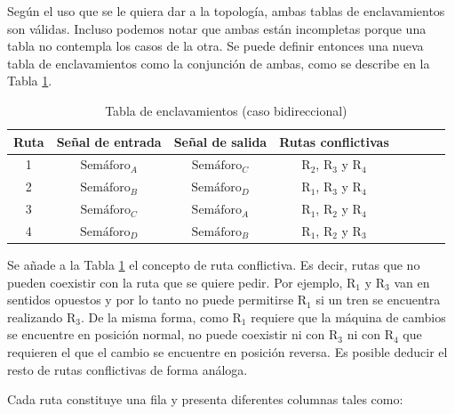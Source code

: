 		Según el uso que se le quiera dar a la topología, ambas tablas de enclavamientos son válidas. Incluso podemos notar que ambas están incompletas porque una tabla no contempla los casos de la otra. Se puede definir entonces una nueva tabla de enclavamientos como la conjunción de ambas, como se describe en la Tabla \ref{Tabla_total}.
		
		\begin{table}[!hbt]
		\renewcommand{\arraystretch}{1.3}
	
		\caption{Tabla de enclavamientos (caso bidireccional)}
		\label{Tabla_total}
		\centering
	
		\begin{tabular}{c c c c c c c c }
		\hline
		Ruta & Señal de entrada & Señal de salida & Rutas conflictivas \\
		\hline
		 1 & $\text{Semáforo}_A$  & $\text{Semáforo}_C$ & $\text{R}_2$, $\text{R}_3$ y $\text{R}_4$ \\
		 2 & $\text{Semáforo}_B$  & $\text{Semáforo}_D$ & $\text{R}_1$, $\text{R}_3$ y $\text{R}_4$ \\
		 3 & $\text{Semáforo}_C$  & $\text{Semáforo}_A$ & $\text{R}_1$, $\text{R}_2$ y $\text{R}_4$ \\
		 4 & $\text{Semáforo}_D$  & $\text{Semáforo}_B$ & $\text{R}_1$, $\text{R}_2$ y $\text{R}_3$ \\
		\hline
		\end{tabular}
		\end{table}
		
		Se añade a la Tabla \ref{Tabla_total} el concepto de ruta conflictiva. Es decir, rutas que no pueden coexistir con la ruta que se quiere pedir. Por ejemplo, $\text{R}_1$ y $\text{R}_3$ van en sentidos opuestos y por lo tanto no puede permitirse $\text{R}_1$ si un tren se encuentra realizando $\text{R}_3$. De la misma forma, como $\text{R}_1$ requiere que la máquina de cambios se encuentre en posición normal, no puede coexistir ni con $\text{R}_3$ ni con $\text{R}_4$ que requieren el que el cambio se encuentre en posición reversa. Es posible deducir el resto de rutas conflictivas de forma análoga.
			
		
		Cada ruta constituye una fila y presenta diferentes columnas tales como:
		
